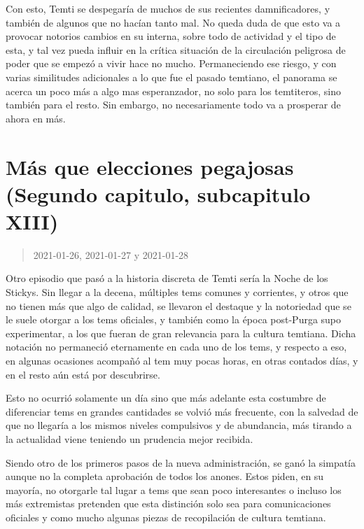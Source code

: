 \documentclass[
  spanish,
]{book}
\begin{document}
Con esto, Temti se despegaría de muchos de sus recientes damnificadores, y también de algunos que no hacían tanto mal. No queda duda de que esto va a provocar notorios cambios en su interna, sobre todo de actividad y el tipo de esta, y tal vez pueda influir en la crítica situación de la circulación peligrosa de poder que se empezó a vivir hace no mucho. Permaneciendo ese riesgo, y con varias similitudes adicionales a lo que fue el pasado temtiano, el panorama se acerca un poco más a algo mas esperanzador, no solo para los temtiteros, sino también para el resto. Sin embargo, no necesariamente todo va a prosperar de ahora en más.

\hypertarget{muxe1s-que-elecciones-pegajosas-segundo-capitulo-subcapitulo-xiii}{%
\section{Más que elecciones pegajosas (Segundo capitulo, subcapitulo XIII)}\label{muxe1s-que-elecciones-pegajosas-segundo-capitulo-subcapitulo-xiii}}

\begin{quote}
2021-01-26, 2021-01-27 y 2021-01-28
\end{quote}

Otro episodio que pasó a la historia discreta de Temti sería la Noche de los Stickys. Sin llegar a la decena, múltiples tems comunes y corrientes, y otros que no tienen más que algo de calidad, se llevaron el destaque y la notoriedad que se le suele otorgar a los tems oficiales, y también como la época post-Purga supo experimentar, a los que fueran de gran relevancia para la cultura temtiana. Dicha notación no permaneció eternamente en cada uno de los tems, y respecto a eso, en algunas ocasiones acompañó al tem muy pocas horas, en otras contados días, y en el resto aún está por descubrirse.

Esto no ocurrió solamente un día sino que más adelante esta costumbre de diferenciar tems en grandes cantidades se volvió más frecuente, con la salvedad de que no llegaría a los mismos niveles compulsivos y de abundancia, más tirando a la actualidad viene teniendo un prudencia mejor recibida.

Siendo otro de los primeros pasos de la nueva administración, se ganó la simpatía aunque no la completa aprobación de todos los anones. Estos piden, en su mayoría, no otorgarle tal lugar a tems que sean poco interesantes o incluso los más extremistas pretenden que esta distinción solo sea para comunicaciones oficiales y como mucho algunas piezas de recopilación de cultura temtiana.
\end{document}
